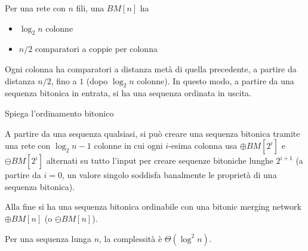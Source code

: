 \begin{questions}
\begin{solution}
        Per una rete con $n$ fili, una $BM[n]$ ha
        \begin{itemize}
            \item $\log_2 n$ colonne
            
            \item $n/2$ comparatori a coppie per colonna
        \end{itemize}
        
        Ogni colonna ha comparatori a distanza metà di quella precedente, a partire da distanza $n/2$, fino a $1$ (dopo $\log_2 n$ colonne). In questo modo, a partire da una sequenza bitonica in entrata, si ha una sequenza ordinata in uscita.
    \end{solution}
    
    \question Spiega l'ordinamento bitonico
    
    \begin{solution}
        A partire da una sequenza qualsiasi, si può creare una sequenza bitonica tramite una rete con $\log_2 n - 1$ colonne in cui ogni $i$-esima colonna usa $\oplus BM [2^i]$ e $\ominus BM [2^i]$ alternati su tutto l'input per creare sequenze bitoniche lunghe $2^{i+1}$ (a partire da $i=0$, un valore singolo soddisfa banalmente le proprietà di una sequenza bitonica).
        
        Alla fine si ha una sequenza bitonica ordinabile con una bitonic merging network $\oplus BM [n]$ (o $\ominus BM [n]$).
        
        Per una sequenza lunga $n$, la complessità è $\Theta (\log^2 n)$.
    \end{solution}
\end{questions}